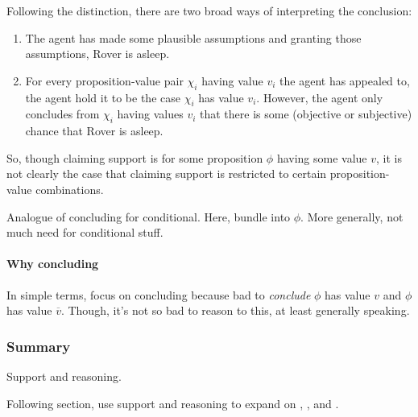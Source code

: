 \begin{note}[Suppositions]
  Following the distinction, there are two broad ways of interpreting the conclusion:
  \begin{enumerate}
  \item
    The agent has made some plausible assumptions and granting those assumptions, Rover is asleep.
  \item
    For every proposition-value pair \(\chi_{i}\) having value \(v_{i}\) the agent has appealed to, the agent hold it to be the case \(\chi_{i}\) has value \(v_{i}\).
    However, the agent only concludes from \(\chi_{i}\) having values \(v_{i}\) that there is some (objective or subjective) chance that Rover is asleep.
  \end{enumerate}
  So, though claiming support is for some proposition \(\phi\) having some value \(v\), it is not clearly the case that claiming support is restricted to certain proposition-value combinations.
\end{note}

\begin{note}[Analogue]
  Analogue of concluding for conditional.
  Here, bundle into \(\phi\).
  More generally, not much need for conditional stuff.
\end{note}

\paragraph{Why concluding}
\label{concluding-consistency}

\begin{note}
  In simple terms, focus on concluding because bad to \emph{conclude} \(\phi\) has value \(v\) and \(\phi\) has value \(\overline{v}\).
  Though, it's not so bad to reason to this, at least generally speaking.
\end{note}

\subsubsection{Summary}
\label{sec:clarification:support-reasoning:summary}

\begin{note}
  Support and reasoning.
\end{note}

\begin{note}
  Following section, use support and reasoning to expand on \qWhy{}, \qHow{}, and \issueInclusion{}.
\end{note}

